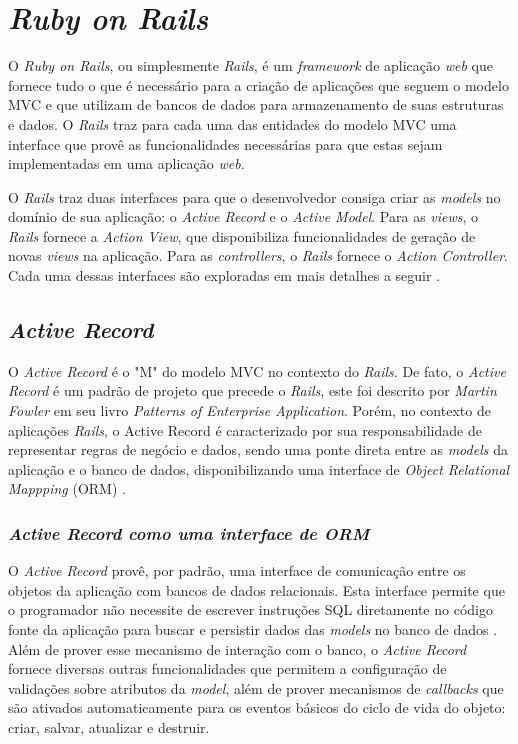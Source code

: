 \section{\textit{Ruby on Rails}}

O \textit{Ruby on Rails}, ou simplesmente \textit{Rails}, é um \textit{framework} de aplicação \textit{web} que fornece tudo o que é necessário para a criação de aplicações que seguem o modelo MVC e que utilizam de bancos de dados para armazenamento de suas estruturas e dados. O \textit{Rails} traz para cada uma das entidades do modelo MVC uma interface que provê as funcionalidades necessárias para que estas sejam implementadas em uma aplicação \textit{web}.

O \textit{Rails} traz duas interfaces para que o desenvolvedor consiga criar as \textit{models} no domínio de sua aplicação: o \textit{Active Record} e o \textit{Active Model}. Para as \textit{views}, o \textit{Rails} fornece a \textit{Action View}, que disponibiliza funcionalidades de geração de novas \textit{views} na aplicação. Para as \textit{controllers}, o \textit{Rails} fornece o \textit{Action Controller}. Cada uma dessas interfaces são exploradas em mais detalhes a seguir \cite{railsapi2023}.

\subsection{\textit{Active Record}}

O \textit{Active Record} é o "M" do modelo MVC no contexto do \textit{Rails}. De fato, o \textit{Active Record} é um padrão de projeto que precede o \textit{Rails}, este foi descrito por \textit{Martin Fowler} em seu livro \textit{Patterns of Enterprise Application}. Porém, no contexto de aplicações \textit{Rails}, o Active Record é caracterizado por sua responsabilidade de representar regras de negócio e dados, sendo uma ponte direta entre as \textit{models} da aplicação e o banco de dados, disponibilizando uma interface de \textit{Object Relational Mappping} (ORM) \cite{activerecord-basics}.

\subsubsection{\textit{Active Record como uma interface de ORM}}

O \textit{Active Record} provê, por padrão, uma interface de comunicação entre os objetos da aplicação com bancos de dados relacionais. Esta interface permite que o programador não necessite de escrever instruções SQL diretamente no código fonte da aplicação para buscar e persistir dados das \textit{models} no banco de dados \cite{activerecord-basics}. Além de prover esse mecanismo de interação com o banco, o \textit{Active Record} fornece diversas outras funcionalidades que permitem a configuração de validações sobre atributos da \textit{model}, além de prover mecanismos de \textit{callbacks} que são ativados automaticamente para os eventos básicos do ciclo de vida do objeto: criar, salvar, atualizar e destruir.

